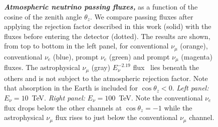 \documentclass[aps,prd,showpacs,letterpaper,onecolumn,longbibliography,superscriptaddress,notitlepage,nofootinbib]{revtex4-1}%
\begin{document}
\begin{figure}
\centering
\caption{\textbf{\textit{Atmospheric neutrino passing fluxes,}} as a function of the cosine of the zenith angle $\theta_z$. We compare passing fluxes after applying the rejection factor described in this work (solid) with the fluxes before entering the detector (dotted). The results are shown, from top to bottom in the left panel, for conventional $\nu_\mu$ (orange), conventional $\nu_e$ (blue), prompt $\nu_e$ (green) and prompt $\nu_\mu$ (magenta) fluxes. The astrophysical $\nu_\mu$ (gray) $E_\nu^{-2.19}$ flux~\cite{Aartsen:2017mau} lies beneath the others and is not subject to the atmospheric rejection factor. Note that absorption in the Earth is included for $\cos \theta_z < 0$. \textit{Left panel:} $E_\nu = 10$~TeV. \textit{Right panel:} $E_\nu = 100$~TeV. Note the conventional $\nu_e$ flux drops below the other channels at $\cos \theta_z = -1$ while the astrophysical $\nu_\mu$ flux rises to just below the conventional $\nu_\mu$ channel.}
\label{fig:fluxes}
\end{figure}
\end{document}

